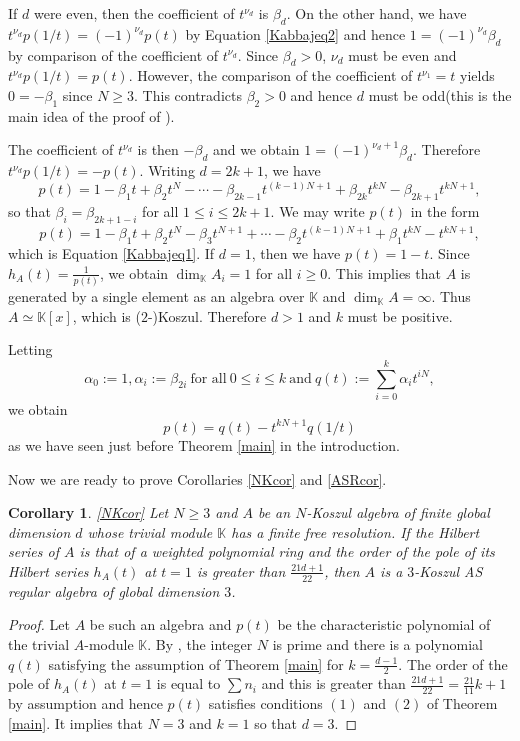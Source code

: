 \documentclass[reqno]{amsart}
\newcommand{\bbK}{\mathbb{K}}
\numberwithin{equation}{section}
\theoremstyle{plain}
\newtheorem{cor}[equation]{Corollary}
\theoremstyle{definition}
\begin{document}
If $d$ were even, then the coefficient
of $t^{\nu_d}$ is $\beta_d$. On the other hand, we have $t^{\nu_d}p(1/t)=(-1)^{\nu_d}p(t)$ by Equation \ref{Kabbajeq2} and hence $1=(-1)^{\nu_d}\beta_d$ by comparison of the coefficient of $t^{\nu_d}$. Since $\beta_d>0$, $\nu_d$ must be even and $t^{\nu_d}p(1/t)=p(t)$. However, the comparison of the coefficient of $t^{\nu_1}=t$ yields $0=-\beta_1$ since $N\geq 3$. This contradicts $\beta_2>0$ and hence $d$ must be odd(this is the main idea of the proof of \cite[Proposition 3.1]{Kabbaj}). 

The coefficient of $t^{\nu_d}$ is then $-\beta_d$ and we obtain $1=(-1)^{\nu_d+1}\beta_d$. Therefore $t^{\nu_d}p(1/t)=-p(t)$. Writing $d=2k+1$, we have
$$p(t)=1-\beta_1t+\beta_2t^N-\cdots-\beta_{2k-1}t^{(k-1)N+1} +\beta_{2k}t^{kN}-\beta_{2k+1}t^{kN+1},$$
so that $\beta_{i}=\beta_{2k+1-i}$ for all $1\leq i\leq 2k+1$.
We may write $p(t)$ in the form
$$p(t)=1-\beta_1t+\beta_2t^N-\beta_3t^{N+1}+\cdots-\beta_2t^{(k-1)N+1}+\beta_1t^{kN} -t^{kN+1},$$
which is Equation \ref{Kabbajeq1}. If $d=1$, then we have $p(t)=1-t$. Since $h_A(t)=\frac{1}{p(t)}$, we obtain $\dim_\bbK A_i=1$ for all $i\geq 0$. This implies that $A$ is generated by a single element as an algebra over $\bbK$ and $\dim_\bbK A=\infty$. Thus $A\simeq\bbK[x]$, which is ($2$-)Koszul. Therefore $d>1$ and $k$ must be positive. 

Letting $$\alpha_0:=1, \alpha_i:=\beta_{2i}\ \text{for all}\ 0\leq i\leq k\ \text{and}\ q(t):=\sum^k_{i=0}\alpha_{i}t^{iN},$$ 
we obtain
$$p(t)=q(t)-t^{kN+1}q(1/t)$$
as we have seen just before Theorem \ref{main} in the introduction.

Now we are ready to prove Corollaries \ref{NKcor} and \ref{ASRcor}.

\begin{cor}\label{Ncor}\ref{NKcor}
    Let $N\geq 3$ and $A$ be an $N$-Koszul algebra of finite global dimension $d$ whose trivial module $\bbK$ has a finite free resolution.
    If the Hilbert series of $A$ is that of a weighted polynomial ring and the order of the pole of its Hilbert series $h_A(t)$ at $t=1$ is greater than $\frac{21d+1}{22}$, then $A$ is a $3$-Koszul AS regular algebra of global dimension $3$.
\end{cor}
\begin{proof}
    Let $A$ be such an algebra and $p(t)$ be the characteristic polynomial of the trivial $A$-module $\bbK$. By \cite[Theorem 1.2(3)]{Kabbaj}, the integer $N$ is prime and there is a polynomial $q(t)$ satisfying the assumption of Theorem \ref{main} for $k=\frac{d-1}{2}$. The order of the pole of $h_A(t)$ at $t=1$ is equal to $\sum n_i$ and this is greater than $\frac{21d+1}{22}=\frac{21}{11}k+1$ by assumption and hence $p(t)$ satisfies conditions $(1)$ and $(2)$ of Theorem \ref{main}. It implies that $N=3$ and $k=1$ so that $d=3$. 
\end{proof}
\end{document}
